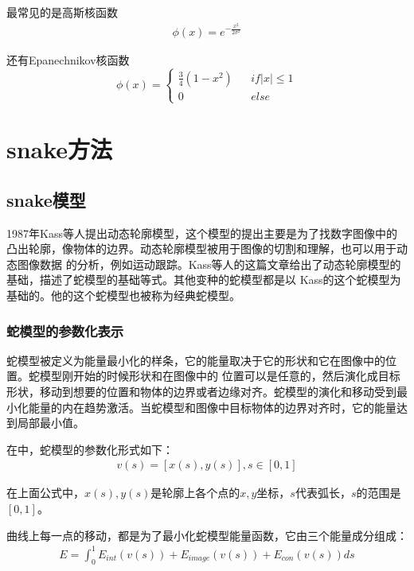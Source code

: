 最常见的是高斯核函数
\begin{align}\label{eq:kernel_guassian}
	\phi (x) = e^{-\frac{x^{2}}{2\sigma^2}}
\end{align}

还有Epanechnikov核函数
\begin{equation}\label{eq:kernel_rectangular}
\phi (x)=\left\{
\begin{aligned}
 \frac{3}{4}(1-x^{2})  && {if \left| x \right| \leq 1} \\
 0  && {else}
\end{aligned}
\right.
\end{equation}


\section{snake方法}
\subsection{snake模型}
1987年Kass等人提出动态轮廓模型\cite{kass1988snakes}，这个模型的提出主要是为了找数字图像中的
凸出轮廓，像物体的边界。动态轮廓模型被用于图像的切割和理解，也可以用于动态图像数据
的分析，例如运动跟踪。Kass等人\cite{kass1988snakes}的这篇文章给出了动态轮廓模型的基础，描述了蛇模型的基础等式。其他变种的蛇模型都是以
Kass的这个蛇模型为基础的。他的这个蛇模型也被称为经典蛇模型。
\subsubsection{蛇模型的参数化表示}
蛇模型被定义为能量最小化的样条，它的能量取决于它的形状和它在图像中的位置。蛇模型刚开始的时候形状和在图像中的
位置可以是任意的，然后演化成目标形状，移动到想要的位置和物体的边界或者边缘对齐。蛇模型的演化和移动受到最小化能量的内在趋势激活。当蛇模型和图像中目标物体的边界对齐时，它的能量达到局部最小值。

在\cite{kass1988snakes}中，蛇模型的参数化形式如下：
\begin{align}\label{eq:base_snake_parameter_representation}
	v(s) = [x(s),y(s)],s \in [0,1]
\end{align}

在上面公式中，$x(s),y(s)$是轮廓上各个点的$x,y$坐标，$s$代表弧长，$s$的范围是$[0,1]$。

曲线上每一点的移动，都是为了最小化蛇模型能量函数，它由三个能量成分组成：
\begin{align}\label{eq:base_snake_calculative_representation}
	E = \int_0^1E_{int}(v(s))+E_{image}(v(s))+E_{con}(v(s)) ds
\end{align}

